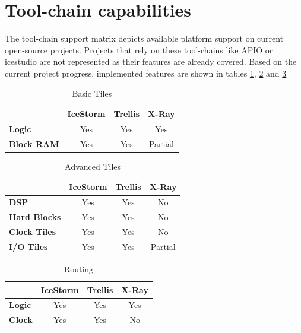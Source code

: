 \section{Tool-chain capabilities}
The tool-chain support matrix depicts available platform support on current open-source projects. Projects that rely on these tool-chains like APIO or icestudio are not represented as their features are already covered.
Based on the current project progress, implemented features are shown in tables \ref{basic-tiles}, \ref{advanced-tiles} and \ref{routing}

\begin{table}[htp]
\centering
\begin{tabular}{|l|c|c|c|}
\hline
       & \multicolumn{1}{l|}{\textbf{IceStorm}} & \multicolumn{1}{l|}{\textbf{Trellis}} & \multicolumn{1}{l|}{\textbf{X-Ray}} \\ \hline
\textbf{Logic}     & Yes     & Yes & Yes \\ \hline
\textbf{Block RAM} & Yes & Yes & Partial \\ \hline
\end{tabular}
\caption{Basic Tiles}
\label{basic-tiles}
\end{table}


\begin{table}[htp]
\centering
\begin{tabular}{|l|c|c|c|}
\hline
                     & \multicolumn{1}{l|}{\textbf{IceStorm}} & \multicolumn{1}{l|}{\textbf{Trellis}} & \multicolumn{1}{l|}{\textbf{X-Ray}} \\ \hline
\textbf{DSP}         & Yes                                    & Yes                                   & No                                  \\ \hline
\textbf{Hard Blocks} & Yes                                    & Yes                                   & No                                  \\ \hline
\textbf{Clock Tiles} & Yes                                    & Yes                                   & No                                  \\ \hline
\textbf{I/O Tiles}   & Yes                                    & Yes                                   & Partial                             \\ \hline
\end{tabular}
\caption{Advanced Tiles}
\label{advanced-tiles}
\end{table}


\begin{table}[htp]
\centering
\begin{tabular}{|l|c|c|c|}
\hline
       & \multicolumn{1}{l|}{\textbf{IceStorm}} & \multicolumn{1}{l|}{\textbf{Trellis}} & \multicolumn{1}{l|}{\textbf{X-Ray}} \\ \hline
\textbf{Logic}     & Yes     & Yes & Yes \\ \hline
\textbf{Clock} & Yes & Yes & No \\ \hline
\end{tabular}
\caption{Routing}
\label{routing}
\end{table}

